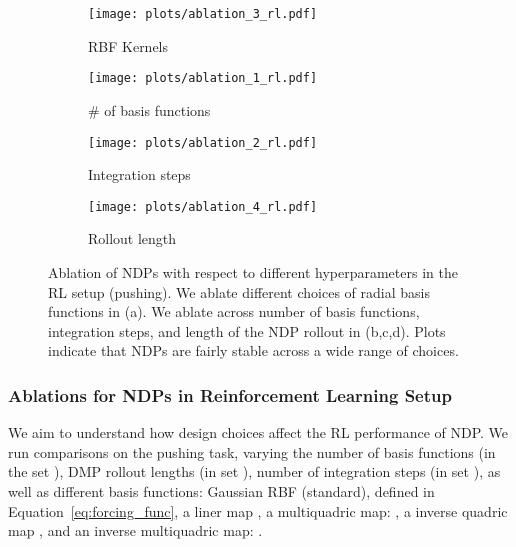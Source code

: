\documentclass{article}
\newcommand{\our}{NDP\xspace}
\newcommand{\ours}{NDPs\xspace}
\begin{document}
\begin{figure}[t!]
\centering
\begin{subfigure}[b]{0.24\linewidth}
    \texttt{[image: plots/ablation\_3\_rl.pdf]}
    \vspace{-0.2in}
    \caption{\small RBF Kernels}
    \label{fig:rl-ablation-1}
\end{subfigure}
\begin{subfigure}[b]{0.24\linewidth}
    \texttt{[image: plots/ablation\_1\_rl.pdf]}
    \vspace{-0.2in}
    \caption{\small \# of basis functions}
    \label{fig:rl-ablation-2}
\end{subfigure}
\begin{subfigure}[b]{0.24\linewidth}
    \texttt{[image: plots/ablation\_2\_rl.pdf]}
    \vspace{-0.2in}
    \caption{\small Integration steps}
    \label{fig:rl-ablation-3}
\end{subfigure}
\begin{subfigure}[b]{0.24\linewidth}
    \texttt{[image: plots/ablation\_4\_rl.pdf]}
    \vspace{-0.2in}
    \caption{\small Rollout length}
    \label{fig:rl-ablation-4}
\end{subfigure}
\vspace{-0.05in}
\caption{\small Ablation of \ours with respect to different hyperparameters in  the RL setup (pushing). We ablate different choices of radial basis functions in (a). We ablate across number of basis functions, integration steps, and length of the \our rollout in (b,c,d). Plots indicate that \ours are fairly stable across a wide range of choices.}
\vspace{-0.08in}
\label{fig:rl-ablations}
\end{figure}

\subsubsection{Ablations for NDPs in Reinforcement Learning Setup}
We aim to understand how design choices affect the RL performance of \our. We run comparisons on the pushing task, varying the number of basis functions  (in the set ), DMP rollout lengths (in set ), number of integration steps (in set ), as well as different basis functions: Gaussian RBF (standard),  defined in Equation~\eqref{eq:forcing_func}, a liner map , a multiquadric map: , a inverse quadric map , and an inverse multiquadric map: .
\end{document}
